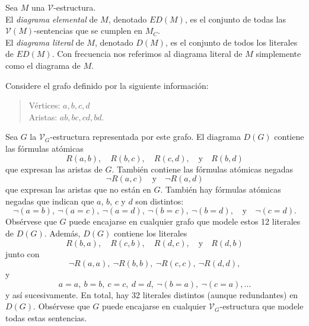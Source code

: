 \message{ !name(main.tex)}\documentclass[12pt,a4paper]{book}
\newcommand{\VV}{\mathcal{V}}
\begin{document}
    \begin{definicion}[Diagrama]\label{def:diagrama}
        Sea $M$ una $\VV$-estructura.\\
        El \textit{diagrama elemental} de $M$, denotado $ED(M)$, es el conjunto de todas las $\VV(M)$-sentencias que se
        cumplen en $M_{C}$.\\
        El \textit{diagrama literal} de $M$, denotado $D(M)$, es el conjunto de todos los literales de $ED(M)$. Con
        frecuencia nos referimos al diagrama literal de $M$ simplemente como el diagrama de $M$.
    \end{definicion}

    \begin{ejemplo}\label{ej:diagrama-grafo}
        Considere el grafo definido por la siguiente información:

        \begin{quote}
            Vértices: $a,b,c,d$\\
            Aristas: $ab,bc,cd,bd$.
        \end{quote}

        Sea $G$ la $\VV_{G}$-estructura representada por este grafo. El diagrama $D(G)$ contiene las fórmulas atómicas
        \begin{equation*}
            R(a,b),\quad R(b,c),\quad R(c,d),\quad\text{y}\quad R(b,d)
        \end{equation*}
        que expresan las aristas de $G$. También contiene las fórmulas atómicas negadas
        \begin{equation*}
            \neg R(a,c)\quad\text{y}\quad\neg R(a,d)
        \end{equation*}
        que expresan las aristas que no están en $G$. También hay fórmulas atómicas negadas que indican que $a$, $b$, $c$
        y $d$ son distintos:
        \begin{equation*}
            \neg(a=b),\ \neg(a=c),\ \neg(a=d),\ \neg(b=c),\ \neg(b=d),\quad\text{y}\quad\neg(c=d).
        \end{equation*}
        Obsérvese que $G$ puede encajarse en cualquier grafo que modele estos 12 literales de $D(G)$. Además, $D(G)$
        contiene los literales
        \begin{equation*}
            R(b,a),\quad R(c,b),\quad R(d,c),\quad\text{y}\quad R(d,b)
        \end{equation*}
        junto con
        \begin{equation*}
            \neg R(a,a),\ \neg R(b,b),\ \neg R(c,c),\ \neg R(d,d),
        \end{equation*}
        y
        \begin{equation*}
            a=a,\ b=b,\ c=c,\ d=d,\ \neg(b=a),\ \neg(c=a),\dots
        \end{equation*}
        y así sucesivamente. En total, hay 32 literales distintos (aunque redundantes) en $D(G)$. Obsérvese que $G$ puede
        encajarse en cualquier $\VV_{G}$-estructura que modele todas estas sentencias.
    \end{ejemplo}
\end{document}
